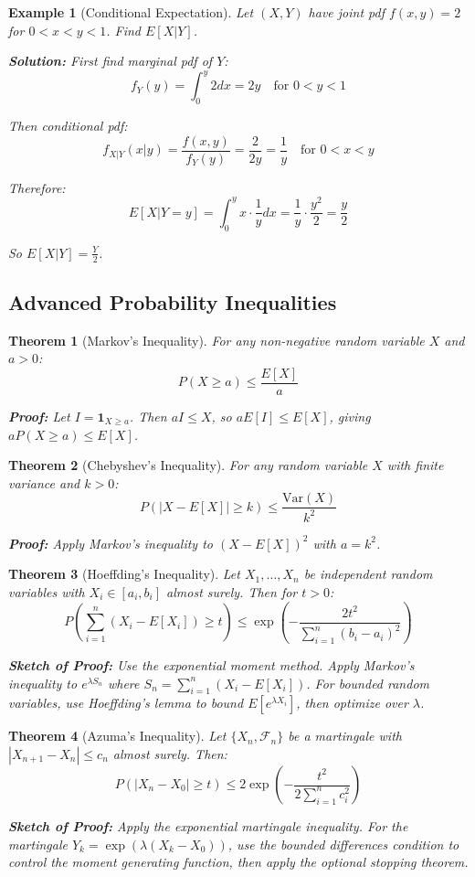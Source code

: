 \documentclass[12pt,a4paper]{article}
\newtheorem{theorem}{Theorem}[section]
\newtheorem{example}{Example}[section]
\theoremstyle{remark}
\begin{document}
\begin{example}[Conditional Expectation]
Let $(X,Y)$ have joint pdf $f(x,y) = 2$ for $0 < x < y < 1$. Find $E[X|Y]$.

\textbf{Solution:}
First find marginal pdf of $Y$:
$$f_Y(y) = \int_0^y 2 dx = 2y \quad \text{for } 0 < y < 1$$

Then conditional pdf:
$$f_{X|Y}(x|y) = \frac{f(x,y)}{f_Y(y)} = \frac{2}{2y} = \frac{1}{y} \quad \text{for } 0 < x < y$$

Therefore:
$$E[X|Y = y] = \int_0^y x \cdot \frac{1}{y} dx = \frac{1}{y} \cdot \frac{y^2}{2} = \frac{y}{2}$$

So $E[X|Y] = \frac{Y}{2}$.
\end{example}

\subsection{Advanced Probability Inequalities}

\begin{theorem}[Markov's Inequality]
For any non-negative random variable $X$ and $a > 0$:
$$P(X \geq a) \leq \frac{E[X]}{a}$$

\textbf{Proof:} Let $I = \mathbf{1}_{X \geq a}$. Then $aI \leq X$, so $aE[I] \leq E[X]$, giving $aP(X \geq a) \leq E[X]$.
\end{theorem}

\begin{theorem}[Chebyshev's Inequality]
For any random variable $X$ with finite variance and $k > 0$:
$$P(|X - E[X]| \geq k) \leq \frac{\text{Var}(X)}{k^2}$$

\textbf{Proof:} Apply Markov's inequality to $(X - E[X])^2$ with $a = k^2$.
\end{theorem}

\begin{theorem}[Hoeffding's Inequality]
Let $X_1, \ldots, X_n$ be independent random variables with $X_i \in [a_i, b_i]$ almost surely. Then for $t > 0$:
$$P\left(\sum_{i=1}^n (X_i - E[X_i]) \geq t\right) \leq \exp\left(-\frac{2t^2}{\sum_{i=1}^n (b_i - a_i)^2}\right)$$

\textbf{Sketch of Proof:} Use the exponential moment method. Apply Markov's inequality to $e^{\lambda S_n}$ where $S_n = \sum_{i=1}^n (X_i - E[X_i])$. For bounded random variables, use Hoeffding's lemma to bound $E[e^{\lambda X_i}]$, then optimize over $\lambda$.
\end{theorem}

\begin{theorem}[Azuma's Inequality]
Let $\{X_n, \mathcal{F}_n\}$ be a martingale with $|X_{n+1} - X_n| \leq c_n$ almost surely. Then:
$$P(|X_n - X_0| \geq t) \leq 2\exp\left(-\frac{t^2}{2\sum_{i=1}^n c_i^2}\right)$$

\textbf{Sketch of Proof:} Apply the exponential martingale inequality. For the martingale $Y_k = \exp(\lambda(X_k - X_0))$, use the bounded differences condition to control the moment generating function, then apply the optional stopping theorem.
\end{theorem}
\end{document}
